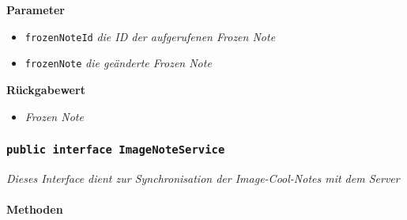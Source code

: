 \begin{itemize}
		\textbf{Parameter} 
			\begin{itemize}
				\item\texttt{frozenNoteId}
		 		\textit{die ID der aufgerufenen Frozen Note }
		 		\item\texttt{frozenNote}
		 		\textit{die geänderte Frozen Note}
	 		\end{itemize}

		\textbf{Rückgabewert} 
		\begin{itemize}
		\item\textit{Frozen Note}
		\end{itemize}

	 \end{itemize}


	\subsubsection{\texttt{public interface ImageNoteService }}
\textit{Dieses Interface dient zur Synchronisation der Image-Cool-Notes mit dem Server}\\
\\
	\textbf{Methoden} 
